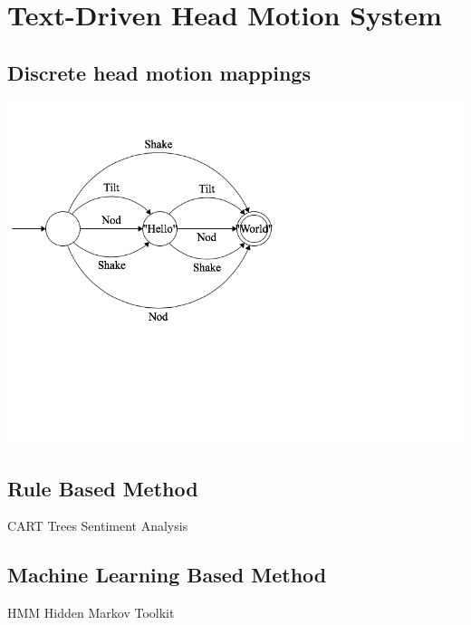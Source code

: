 \documentclass[bsc,frontabs,twoside,singlespacing,parskip]{infthesis}
\begin{document}
\chapter{Text-Driven Head Motion System}

\section{Discrete head motion mappings}
\includegraphics[scale=0.5]{fsm}
\section{Rule Based Method}
CART Trees
Sentiment Analysis

\section{Machine Learning Based Method}
HMM
Hidden Markov Toolkit
\end{document}
